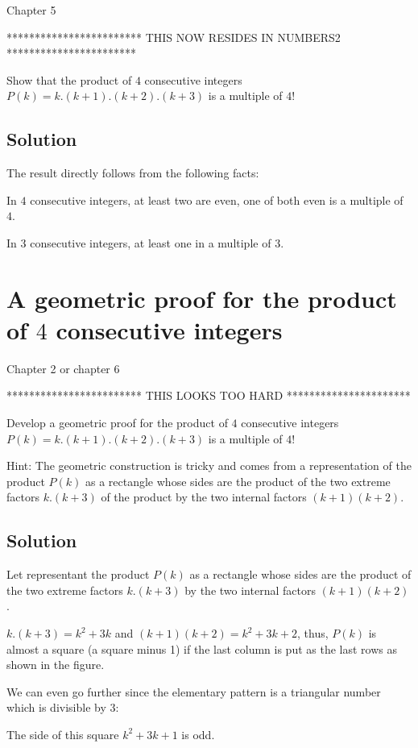 \documentclass{article}[12pt]
\begin{document}
Chapter 5

************************
THIS NOW RESIDES IN NUMBERS2
***********************


Show that the product of $4$ consecutive integers $P(k) = k.(k+1).(k+2).(k+3)$
is a multiple of $4!$


\subsection{Solution}

The result directly follows from the following facts:

In $4$ consecutive integers, at least two are even, one of both even is a multiple of $4$.

In $3$ consecutive integers, at least one in a multiple of $3$.


\section{A geometric proof for the product of $4$ consecutive integers}

Chapter 2 or chapter 6

************************
THIS LOOKS TOO HARD
**********************


Develop a geometric proof for the product of $4$ consecutive integers $P(k) = k.(k+1).(k+2).(k+3)$
is a multiple of $4!$

Hint:
The geometric construction is tricky and comes from a representation of the product $P(k)$ as a rectangle whose sides are the product of the two extreme factors 
$k.(k+3)$ of the product by the two internal factors $(k+1)(k+2)$.

\subsection{Solution}
Let representant the product $P(k)$ as a rectangle whose sides are the product of the two extreme factors 
$k.(k+3)$ by the two internal factors $(k+1)(k+2)$.

$k.(k+3) = k^2 + 3k$ and $(k+1)(k+2) = k^2 + 3k +2$, thus, $P(k)$ is almost a square (a square minus 1)
if the last column is put as the last rows as shown in the figure.

We can even go further since the elementary pattern is a triangular number which is divisible by $3$:

The side of this square $k^2+3k+1$ is odd. 
\end{document}
